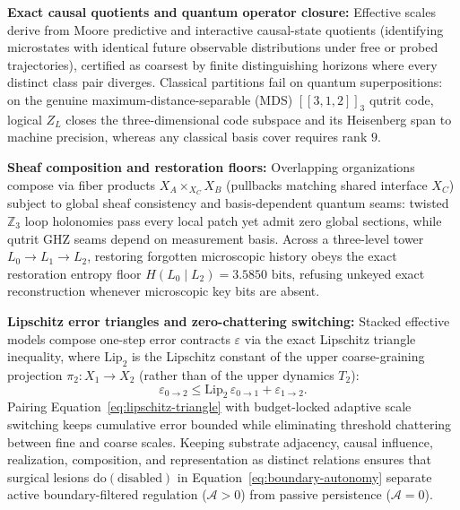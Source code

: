 \textbf{Exact causal quotients and quantum operator closure:} Effective scales derive from Moore predictive and
interactive causal-state quotients \cite{moore1956} (identifying microstates with identical future observable
distributions under free or probed trajectories), certified as coarsest by finite distinguishing horizons where every
distinct class pair diverges. Classical partitions fail on quantum superpositions: on the genuine
maximum-distance-separable (MDS) $[[3, 1, 2]]_3$ qutrit code, logical $Z_L$ closes the three-dimensional code subspace
and its Heisenberg span to machine precision, whereas any classical basis cover requires rank $9$.

\textbf{Sheaf composition and restoration floors:} Overlapping organizations compose via fiber products
$X_A \times_{X_C} X_B$ (pullbacks matching shared interface $X_C$) subject to global sheaf consistency and
basis-dependent quantum seams: twisted $\mathbb{Z}_3$ loop holonomies pass every local patch yet admit zero global
sections, while qutrit GHZ seams depend on measurement basis. Across a three-level tower $L_0 \to L_1 \to L_2$,
restoring forgotten microscopic history obeys the exact restoration entropy floor $H(L_0 \mid L_2) = 3.5850\text{ bits}$,
refusing unkeyed exact reconstruction whenever microscopic key bits are absent.

\textbf{Lipschitz error triangles and zero-chattering switching:} Stacked effective models compose one-step error
contracts $\varepsilon$ via the exact Lipschitz triangle inequality, where $\mathrm{Lip}_2$ is the Lipschitz constant
of the upper coarse-graining projection $\pi_2 : X_1 \to X_2$ (rather than of the upper dynamics $T_2$):
\begin{equation}
\varepsilon_{0 \to 2} \le \mathrm{Lip}_2\, \varepsilon_{0 \to 1} + \varepsilon_{1 \to 2}.
\label{eq:lipschitz-triangle}
\end{equation}
Pairing Equation~\eqref{eq:lipschitz-triangle} with budget-locked adaptive scale switching keeps cumulative error
bounded while eliminating threshold chattering between fine and coarse scales. Keeping substrate adjacency, causal
influence, realization, composition, and representation as distinct relations ensures that surgical lesions
$\mathrm{do}(\mathrm{disabled})$ in Equation~\eqref{eq:boundary-autonomy} separate active boundary-filtered regulation
($\mathcal{A} > 0$) from passive persistence ($\mathcal{A} = 0$).

